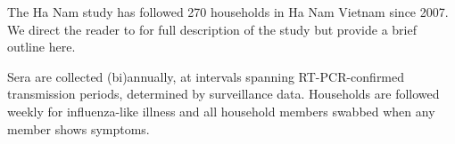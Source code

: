 The Ha Nam study has followed 270 households in Ha Nam Vietnam since 2007. We direct the reader to \cite{Horby;2012} for full description of the study but provide a brief outline here.

Sera are collected (bi)annually, at intervals spanning RT-PCR-confirmed transmission periods, determined by surveillance data. Households are followed weekly for influenza-like illness and all household members swabbed when any member shows symptoms.
